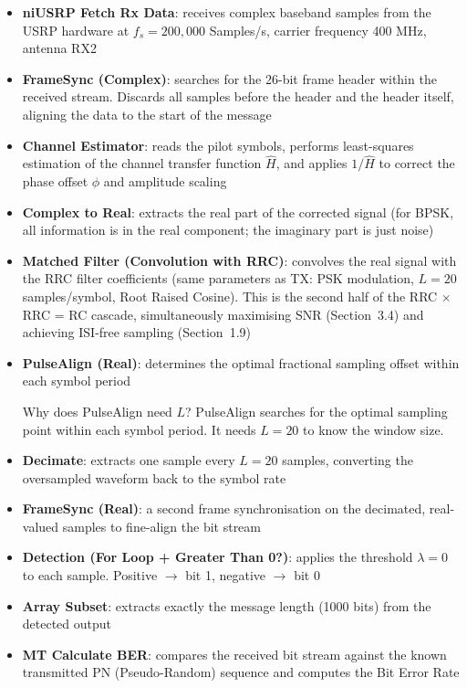 \begin{itemize}
\item \textbf{niUSRP Fetch Rx Data}: receives complex baseband samples from the USRP hardware at $f_s = 200{,}000$ Samples/s, carrier frequency 400 MHz, antenna RX2

\item \textbf{FrameSync (Complex)}: searches for the 26-bit frame header within the received stream. Discards all samples before the header and the header itself, aligning the data to the start of the message

\item \textbf{Channel Estimator}: reads the pilot symbols, performs least-squares estimation of the channel transfer function $\hat{H}$, and applies $1/\hat{H}$ to correct the phase offset $\phi$ and amplitude scaling

\item \textbf{Complex to Real}: extracts the real part of the corrected signal (for BPSK, all information is in the real component; the imaginary part is just noise)

\item \textbf{Matched Filter (Convolution with RRC)}: convolves the real signal with the RRC filter coefficients (same parameters as TX: PSK modulation, $L = 20$ samples/symbol, Root Raised Cosine). This is the second half of the RRC $\times$ RRC = RC cascade, simultaneously maximising SNR (Section~3.4) and achieving ISI-free sampling (Section~1.9)

\item \textbf{PulseAlign (Real)}: determines the optimal fractional sampling offset within each symbol period

\begin{IntuitionBox}{Why does PulseAlign need $L$?}
PulseAlign searches for the optimal sampling point within each symbol period. It needs $L = 20$ to know the window size.
\end{IntuitionBox}

\item \textbf{Decimate}: extracts one sample every $L = 20$ samples, converting the oversampled waveform back to the symbol rate

\item \textbf{FrameSync (Real)}: a second frame synchronisation on the decimated, real-valued samples to fine-align the bit stream

\item \textbf{Detection (For Loop + Greater Than 0?)}: applies the threshold $\lambda = 0$ to each sample. Positive $\rightarrow$ bit 1, negative $\rightarrow$ bit 0

\item \textbf{Array Subset}: extracts exactly the message length (1000 bits) from the detected output

\item \textbf{MT Calculate BER}: compares the received bit stream against the known transmitted PN (Pseudo-Random) sequence and computes the Bit Error Rate
\end{itemize}

